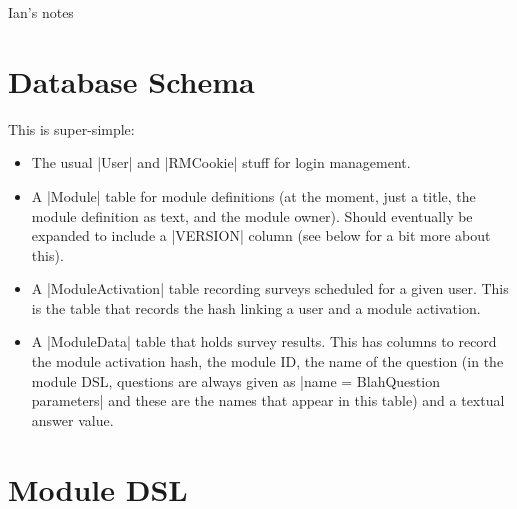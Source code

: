 \documentclass[DIV=calc,paper=a4,fontsize=11pt]{scrartcl}
\begin{document}
\DefineShortVerb{\|}

\begin{flushleft}
  \fontsize{20}{20}
  \selectfont
Ian's notes
\end{flushleft}
\vspace{-10pt}

\thispagestyle{fancy}

\section*{Database Schema}

This is super-simple:

\begin{itemize}
  \item{The usual |User| and |RMCookie| stuff for login management.}
  \item{A |Module| table for module definitions (at the moment, just a
    title, the module definition as text, and the module owner).
    Should eventually be expanded to include a |VERSION| column (see
    below for a bit more about this).}
  \item{A |ModuleActivation| table recording surveys scheduled for a
    given user.  This is the table that records the hash linking a
    user and a module activation.}
  \item{A |ModuleData| table that holds survey results.  This has
    columns to record the module activation hash, the module ID, the
    name of the question (in the module DSL, questions are always
    given as |name = BlahQuestion parameters| and these are the names
    that appear in this table) and a textual answer value.}
\end{itemize}

\section*{Module DSL}
\end{document}
